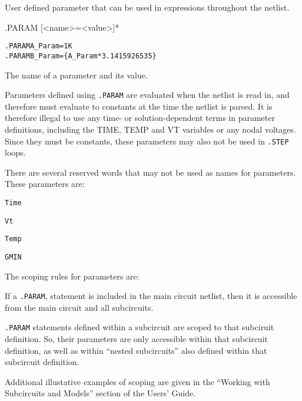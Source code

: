 



User defined parameter that can be used in expressions throughout the netlist.

\begin{Command}

\format
.PARAM [<name>=<value>]*

\examples
\begin{alltt}
.PARAM A_Param=1K
.PARAM B_Param=\{A_Param*3.1415926535\}
\end{alltt}

\arguments

\begin{Arguments}

The name of a parameter and its value.
\medskip

\end{Arguments}

\comments
Parameters defined using \verb+.PARAM+ are evaluated when the netlist is read in, and therefore must evaluate to constants at the time the netlist is parsed.  It is therefore illegal to use any time- or solution-dependent terms in parameter definitions, including the TIME, TEMP and VT variables or any nodal voltages.   Since they must be constants, these parameters may also not be used in \texttt{.STEP} loops.

There are several reserved words that may not be used as names for parameters.  These parameters are:
\begin{XyceItemize}
\item \verb+Time+ 
\item \verb+Vt+
\item \verb+Temp+
\item \verb+GMIN+
\end{XyceItemize}

The scoping rules for parameters are:
\begin{XyceItemize}
\item If a \texttt{.PARAM}, statement is included in the main circuit 
netlist, then it is accessible from the main circuit and all subcircuits. 
\item \texttt{.PARAM} statements defined within a subcircuit are scoped 
to that subciruit definition.  So, their parameters are only accessible within 
that subcircuit definition, as well as within ``nested subcircuits'' also 
defined within that subcircuit definition.
\end{XyceItemize}

Additional illustative examples of scoping are given in the
``Working with Subcircuits and Models'' section of the \Xyce{} Users' 
Guide\UsersGuide. 

\end{Command}

